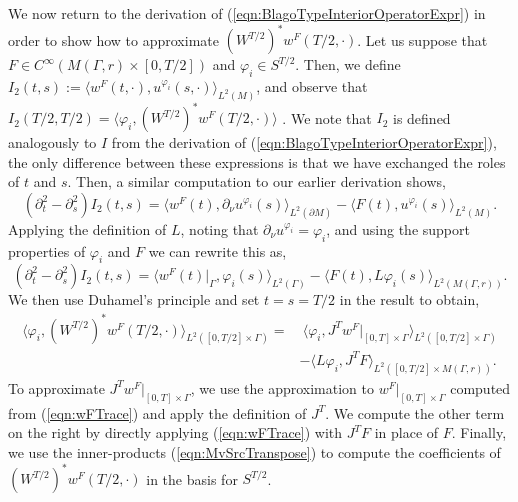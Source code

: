 \documentclass[final,leqno]{siamart1116}
\begin{document}
We now return to the derivation of
(\ref{eqn:BlagoTypeInteriorOperatorExpr}) in order to show how to
approximate $(W^{T/2})^*w^F(T/2,\cdot)$.  Let us suppose that $F \in
C^\infty(M(\Gamma,r)\times[0,T/2])$ and $\varphi_i \in S^{T/2}$. Then,
we define $I_2(t,s) := \langle w^F(t,\cdot),u^{\varphi_i}(s,\cdot)
\rangle_{L^2(M)}$, and observe that $I_2(T/2,T/2) = \langle \varphi_i, (W^{T/2})^*w^F(T/2,\cdot)\rangle$ . We note that $I_2$ is defined analogously to $I$ from
the derivation of (\ref{eqn:BlagoTypeInteriorOperatorExpr}), the only
difference between these expressions is that we have exchanged the
roles of $t$ and $s$. Then, a similar computation to our earlier derivation
shows,
\begin{equation*}
  ({\partial}_t^2 - {\partial}_s^2)I_2(t,s) = \langle w^F(t), {\partial}_\nu u^{\varphi_i}(s) \rangle_{L^2({\partial} M)}
  - \langle F(t), u^{\varphi_i}(s)\rangle_{L^2(M)}.
\end{equation*}
Applying the definition of $L$, noting that ${\partial}_\nu u^{\varphi_i} =
\varphi_i$, and using the support properties of $\varphi_i$ and $F$ we
can rewrite this as,
\begin{equation*}
  ({\partial}_t^2 - {\partial}_s^2)I_2(t,s) = \langle w^F(t)|_{\Gamma},
  \varphi_i(s) \rangle_{L^2(\Gamma)} - \langle F(t), L\varphi_i(s)\rangle_{L^2(M(\Gamma,r))}.
\end{equation*}
We then use Duhamel's principle and set $t=s=T/2$ in the result to
obtain,
\begin{equation}
  \label{eqn:MvSrcTranspose}
  \begin{split}
    \langle \varphi_i, (W^{T/2})^*w^F(T/2,\cdot)\rangle_{L^2([0,T/2]\times\Gamma)}
    = &~\langle \varphi_i, J^T w^F|_{[0,T] \times
      \Gamma}\rangle_{L^2([0,T/2] \times \Gamma)} \\ & - \langle L\varphi_i,
    J^T F\rangle_{L^2([0,T/2] \times M(\Gamma,r))}.
  \end{split}
\end{equation}
To approximate $J^Tw^F|_{[0,T]\times\Gamma}$, we use the approximation
to $w^F|_{[0,T]\times\Gamma}$ computed from (\ref{eqn:wFTrace}) and
apply the definition of $J^T$. We compute the other term on the right
by directly applying (\ref{eqn:wFTrace}) with $J^T F$ in place of $F$.
Finally, we use the inner-products (\ref{eqn:MvSrcTranspose}) to
compute the coefficients of $(W^{T/2})^*w^F(T/2,\cdot)$ in the basis
for $S^{T/2}$.
\end{document}
